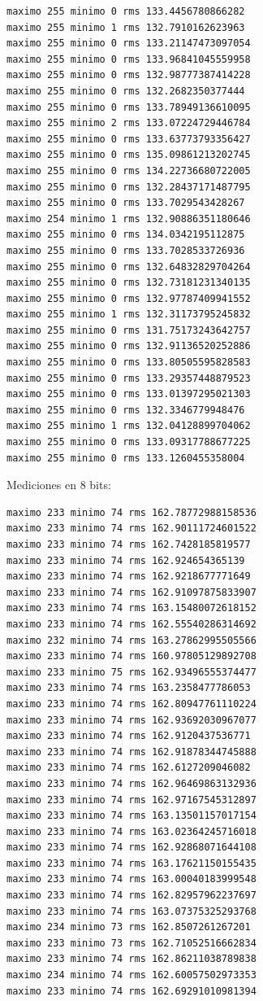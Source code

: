 \documentclass[
    11pt,
    spanish,
	a4paper
]{article}
\begin{document}
\begin{lstlisting}
maximo 255 minimo 0 rms 133.4456780866282
maximo 255 minimo 1 rms 132.7910162623963
maximo 255 minimo 0 rms 133.21147473097054
maximo 255 minimo 0 rms 133.96841045559958
maximo 255 minimo 0 rms 132.98777387414228
maximo 255 minimo 0 rms 132.2682350377444
maximo 255 minimo 0 rms 133.78949136610095
maximo 255 minimo 2 rms 133.07224729446784
maximo 255 minimo 0 rms 133.63773793356427
maximo 255 minimo 0 rms 135.09861213202745
maximo 255 minimo 0 rms 134.22736680722005
maximo 255 minimo 0 rms 132.28437171487795
maximo 255 minimo 0 rms 133.7029543428267
maximo 254 minimo 1 rms 132.90886351180646
maximo 255 minimo 0 rms 134.0342195112875
maximo 255 minimo 0 rms 133.7028533726936
maximo 255 minimo 0 rms 132.64832829704264
maximo 255 minimo 0 rms 132.73181231340135
maximo 255 minimo 0 rms 132.97787409941552
maximo 255 minimo 1 rms 132.31173795245832
maximo 255 minimo 0 rms 131.75173243642757
maximo 255 minimo 0 rms 132.91136520252886
maximo 255 minimo 0 rms 133.80505595828583
maximo 255 minimo 0 rms 133.29357448879523
maximo 255 minimo 0 rms 133.01397295021303
maximo 255 minimo 0 rms 132.3346779948476
maximo 255 minimo 1 rms 132.04128899704062
maximo 255 minimo 0 rms 133.09317788677225
maximo 255 minimo 0 rms 133.1260455358004
\end{lstlisting}

Mediciones en 8 bits:

\begin{lstlisting}
maximo 233 minimo 74 rms 162.78772988158536
maximo 233 minimo 74 rms 162.90111724601522
maximo 233 minimo 74 rms 162.7428185819577
maximo 233 minimo 74 rms 162.924654365139
maximo 233 minimo 74 rms 162.9218677771649
maximo 233 minimo 74 rms 162.91097875833907
maximo 233 minimo 74 rms 163.15480072618152
maximo 233 minimo 74 rms 162.55540286314692
maximo 232 minimo 74 rms 163.27862995505566
maximo 233 minimo 74 rms 160.97805129892708
maximo 233 minimo 75 rms 162.93496555374477
maximo 233 minimo 74 rms 163.2358477786053
maximo 233 minimo 74 rms 162.80947761110224
maximo 233 minimo 74 rms 162.93692030967077
maximo 233 minimo 74 rms 162.9120437536771
maximo 233 minimo 74 rms 162.91878344745888
maximo 233 minimo 74 rms 162.6127209046082
maximo 233 minimo 74 rms 162.96469863132936
maximo 233 minimo 74 rms 162.97167545312897
maximo 233 minimo 74 rms 163.13501157017154
maximo 233 minimo 74 rms 163.02364245716018
maximo 233 minimo 74 rms 162.92868071644108
maximo 233 minimo 74 rms 163.17621150155435
maximo 233 minimo 74 rms 163.00040183999548
maximo 233 minimo 74 rms 162.82957962237697
maximo 233 minimo 74 rms 163.07375325293768
maximo 234 minimo 73 rms 162.8507261267201
maximo 233 minimo 73 rms 162.71052516662834
maximo 233 minimo 74 rms 162.86211038789838
maximo 234 minimo 74 rms 162.60057502973353
maximo 233 minimo 74 rms 162.69291010981394
\end{lstlisting}
\end{document}
